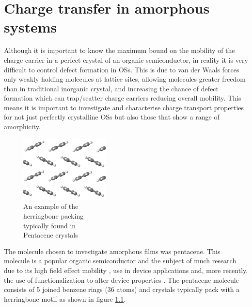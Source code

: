 \chapter{Charge transfer in amorphous systems}
\label{chap:surface_hopping_app}
Although it is important to know the maximum bound on the mobility of the charge carrier in a perfect crystal of an organic semiconductor, in reality it is very difficult to control defect formation in OSs\cite{NGUYEN2006198i, Ray2014}. This is due to van der Waals forces only weakly holding molecules at lattice sites, allowing molecules greater freedom than in traditional inorganic crystal, and increasing the chance of defect formation which can trap/scatter charge carriers reducing overall mobility. This means it is important to investigate and characterise charge transport properties for not just perfectly crystalline OSs but also those that show a range of amorphicity.
\\
\begin{figure}
	\vspace*{-0.5cm}
	\includegraphics[width=0.4\textwidth]{img/herringbone.png}
	\caption{An example of the \\herringbone packing \\typically found in \\Pentacene crystals}
	\label{fig:HerringbonePacking}
\end{figure}
The molecule chosen to investigate amorphous films was pentacene. This molecule is a popular organic semiconductor and the subject of much research due to its high field effect mobility \cite{Hu2005}, use in device applications \cite{Hasegawa_2009} and, more recently, the use of functionalization to alter device properties \cite{Anthony2001, Anthony2002}. The pentacene molecule consists of 5 joined benzene rings (36 atoms) and crystals typically pack with a herringbone motif as shown in figure \ref{fig:HerringbonePacking}.
\clearpage
